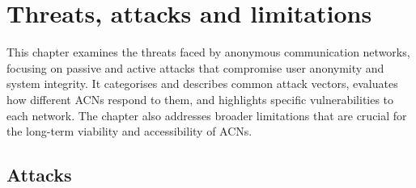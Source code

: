 \chapter{Threats, attacks and limitations}

This chapter examines the threats faced by anonymous communication networks, focusing on passive and active attacks that compromise user anonymity and system integrity. It categorises and describes common attack vectors, evaluates how different ACNs respond to them, and highlights specific vulnerabilities to each network. The chapter also addresses broader limitations that are crucial for the long-term viability and accessibility of ACNs.

\section{Attacks}

